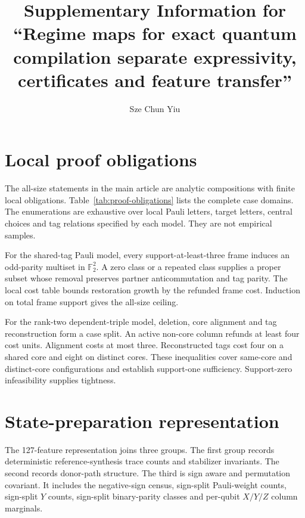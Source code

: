 \documentclass[a4paper,onecolumn,11pt,unpublished,noarxiv]{quantumarticle}
\begin{document}
\title{Supplementary Information for ``Regime maps for exact quantum compilation separate expressivity, certificates and feature transfer''}
\author{Sze Chun Yiu}
\maketitle


\section{Local proof obligations}

The all-size statements in the main article are analytic compositions with finite local obligations.  Table~\ref{tab:proof-obligations} lists the complete case domains.  The enumerations are exhaustive over local Pauli letters, target letters, central choices and tag relations specified by each model.  They are not empirical samples.

For the shared-tag Pauli model, every support-at-least-three frame induces an odd-parity multiset in $\mathbb{F}_2^2$.  A zero class or a repeated class supplies a proper subset whose removal preserves partner anticommutation and tag parity.  The local cost table bounds restoration growth by the refunded frame cost.  Induction on total frame support gives the all-size ceiling.

For the rank-two dependent-triple model, deletion, core alignment and tag reconstruction form a case split.  An active non-core column refunds at least four cost units.  Alignment costs at most three.  Reconstructed tags cost four on a shared core and eight on distinct cores.  These inequalities cover same-core and distinct-core configurations and establish support-one sufficiency.  Support-zero infeasibility supplies tightness.

\ProofObligationsTable
\FloatBarrier

\section{State-preparation representation}

The 127-feature representation joins three groups.  The first group records deterministic reference-synthesis trace counts and stabilizer invariants.  The second records donor-path structure.  The third is sign aware and permutation covariant.  It includes the negative-sign census, sign-split Pauli-weight counts, sign-split $Y$ counts, sign-split binary-parity classes and per-qubit $X/Y/Z$ column marginals.
\end{document}
